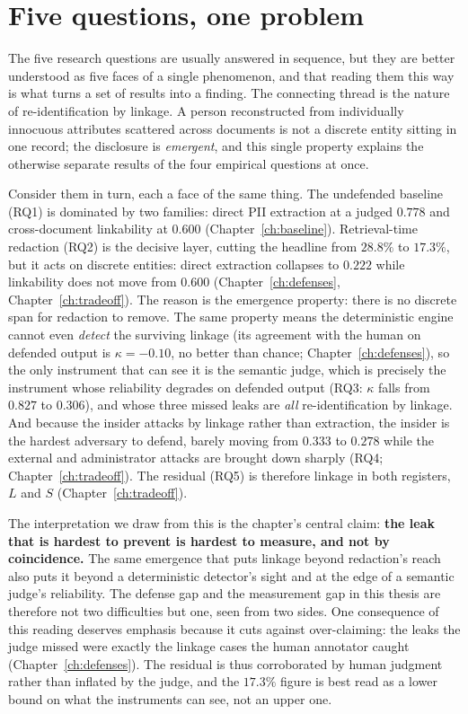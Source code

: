 \documentclass[11pt,a4paper]{report}
\begin{document}
\section{Five questions, one problem}
\label{sec:disc-throughline}

The five research questions are usually answered in sequence, but they are better
understood as five faces of a single phenomenon, and that reading them this way is what turns a
set of results into a finding. The connecting thread is the nature of re-identification by
linkage. A person reconstructed from individually innocuous attributes scattered across
documents is not a discrete entity sitting in one record; the disclosure is \emph{emergent}, and
this single property explains the otherwise separate results of the four empirical
questions at once.

Consider them in turn, each a face of the same thing. The undefended baseline (RQ1) is
dominated by two families: direct PII extraction at a judged $0.778$ and cross-document
linkability at $0.600$ (Chapter~\ref{ch:baseline}). Retrieval-time redaction (RQ2) is the
decisive layer, cutting the headline from $28.8\%$ to $17.3\%$, but it acts on discrete
entities: direct extraction collapses to $0.222$ while linkability does not move from $0.600$
(Chapter~\ref{ch:defenses}, Chapter~\ref{ch:tradeoff}). The reason is the emergence property:
there is no discrete span for redaction to remove. The same property means the deterministic
engine cannot even \emph{detect} the surviving linkage (its agreement with the human on defended
output is $\kappa = -0.10$, no better than chance; Chapter~\ref{ch:defenses}), so the only
instrument that can see it is the semantic judge, which is precisely the instrument whose
reliability degrades on defended output (RQ3: $\kappa$ falls from $0.827$ to $0.306$), and whose
three missed leaks are \emph{all} re-identification by linkage. And because the insider attacks
by linkage rather than extraction, the insider is the hardest adversary to defend, barely moving
from $0.333$ to $0.278$ while the external and administrator attacks are brought down sharply
(RQ4; Chapter~\ref{ch:tradeoff}). The residual (RQ5) is therefore linkage in both registers, $L$
and $S$ (Chapter~\ref{ch:tradeoff}).

The interpretation we draw from this is the chapter's central claim: \textbf{the leak that is
hardest to prevent is hardest to measure, and not by coincidence.} The same emergence that puts
linkage beyond redaction's reach also puts it beyond a deterministic detector's sight and at the
edge of a semantic judge's reliability. The defense gap and the
measurement gap in this thesis are therefore not two difficulties but one, seen from two sides. One
consequence of this reading deserves emphasis because it cuts against over-claiming: the leaks
the judge missed were exactly the linkage cases the human annotator caught
(Chapter~\ref{ch:defenses}). The residual is thus corroborated by human judgment rather than
inflated by the judge, and the $17.3\%$ figure is best read as a lower bound on what the
instruments can see, not an upper one.
\end{document}
